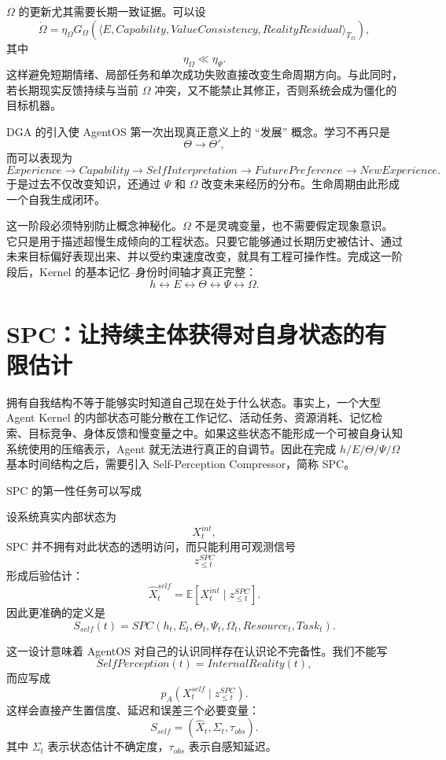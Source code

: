 $\Omega$ 的更新尤其需要长期一致证据。可以设
\[
\dot\Omega
=
\eta_\Omega
G_\Omega
\left(
\langle
E,
Capability,
ValueConsistency,
RealityResidual
\rangle_{T_\Omega}
\right),
\]
其中
\[
\eta_\Omega\ll\eta_\Psi.
\]
这样避免短期情绪、局部任务和单次成功失败直接改变生命周期方向。与此同时，若长期现实反馈持续与当前 $\Omega$ 冲突，又不能禁止其修正，否则系统会成为僵化的目标机器。

DGA 的引入使 AgentOS 第一次出现真正意义上的 ``发展'' 概念。学习不再只是
\[
\Theta\rightarrow\Theta',
\]
而可以表现为
\[
Experience
\rightarrow
Capability
\rightarrow
SelfInterpretation
\rightarrow
FuturePreference
\rightarrow
NewExperience.
\]
于是过去不仅改变知识，还通过 $\Psi$ 和 $\Omega$ 改变未来经历的分布。生命周期由此形成一个自我生成闭环。

这一阶段必须特别防止概念神秘化。$\Omega$ 不是灵魂变量，也不需要假定现象意识。它只是用于描述超慢生成倾向的工程状态。只要它能够通过长期历史被估计、通过未来目标偏好表现出来、并以受约束速度改变，就具有工程可操作性。完成这一阶段后，Kernel 的基本记忆--身份时间轴才真正完整：
\[
h
\leftrightarrow
E
\leftrightarrow
\Theta
\leftrightarrow
\Psi
\leftrightarrow
\Omega.
\]

\section{SPC：让持续主体获得对自身状态的有限估计}

拥有自我结构不等于能够实时知道自己现在处于什么状态。事实上，一个大型 Agent Kernel 的内部状态可能分散在工作记忆、活动任务、资源消耗、记忆检索、目标竞争、身体反馈和慢变量之中。如果这些状态不能形成一个可被自身认知系统使用的压缩表示，Agent 就无法进行真正的自调节。因此在完成 $h/E/\Theta/\Psi/\Omega$ 基本时间结构之后，需要引入 Self-Perception Compressor，简称 SPC。

SPC 的第一性任务可以写成
\begin{statementbox}
\centering
{}
\end{statementbox}
设系统真实内部状态为
\[
X_t^{int},
\]
SPC 并不拥有对此状态的透明访问，而只能利用可观测信号
\[
z_{\le t}^{SPC}
\]
形成后验估计：
\[
\hat X_t^{self}
=
\mathbb E
\left[
X_t^{int}
\mid
z_{\le t}^{SPC}
\right].
\]
因此更准确的定义是
\[
S_{self}(t)
=
SPC(
h_t,E_t,\Theta_t,\Psi_t,\Omega_t,
Resource_t,Task_t
).
\]

这一设计意味着 AgentOS 对自己的认识同样存在认识论不完备性。我们不能写
\[
SelfPerception(t)=InternalReality(t),
\]
而应写成
\[
p_A
\left(
X_t^{self}
\mid
z_{\le t}^{SPC}
\right).
\]
这样会直接产生置信度、延迟和误差三个必要变量：
\[
S_{self}
=
(\hat X_t,\Sigma_t,\tau_{obs}).
\]
其中 $\Sigma_t$ 表示状态估计不确定度，$\tau_{obs}$ 表示自感知延迟。

